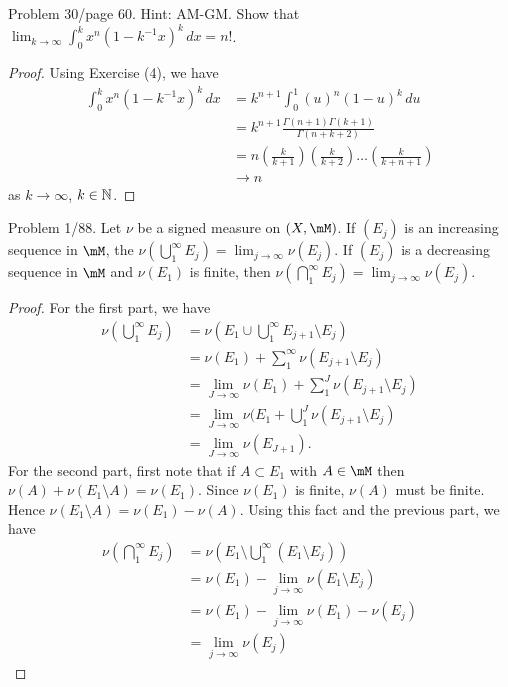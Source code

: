 \documentclass{article}
\begin{document}
 Problem 30/page 60. Hint: AM-GM. Show that $\lim_{k \to \infty} \int_0^k x^n (1 - k^{-1} x) ^k \, dx = n!$.
\begin{proof}
Using Exercise (4), we have
\begin{align*}
\int_0^k x^n (1 - k^{-1} x) ^k \, dx & =  k^{n+1} \int_0^1 (u)^n (1 - u)^k   \, du
\\ & =  k^{n+1} \frac{\Gamma(n+1) \Gamma(k+1)}{\Gamma(n + k + 2)}
\\ & =  n\! \left( \frac k {k +1} \right) \left( \frac k {k +2} \right) \ldots \left( \frac k {k +n +1} \right)
\\ & \to n\!
\end{align*}
as $k \to \infty$, $k \in \mathbb{N}$.
\end{proof}

 Problem 1/88. Let $\nu$ be a signed measure on $(X, \mM)$. If $(E_j)$ is an increasing sequence in $\mM$, the $\nu(\bigcup_1^\infty E_j) = \lim_{j \to \infty} \nu(E_j)$. If $(E_j)$ is a decreasing sequence in $\mM$ and $\nu(E_1)$ is finite, then $\nu(\bigcap_1^\infty E_j) = \lim_{j \to \infty} \nu(E_j)$.
\begin{proof}
For the first part, we have
\begin{align*}
\nu(\bigcup_1^\infty E_j) & = \nu(E_1 \cup \bigcup_1^\infty E_{j+1} \setminus E_j)  
\\ & = \nu(E_1) + \sum_1^\infty \nu(E_{j+1} \setminus E_j)
\\ & = \lim_{J \to \infty} \nu(E_1) + \sum_1^J \nu(E_{j+1} \setminus E_j)
\\ & = \lim_{J \to \infty} \nu(E_1 + \bigcup_1^J \nu(E_{j+1} \setminus E_j)
\\ & = \lim_{J \to \infty} \nu(E_{J+1}).
\end{align*}
For the second part, first note that if $A \subset E_1$ with $A \in \mM$ then $\nu(A) + \nu(E_1 \setminus A) = \nu(E_1)$. Since $\nu(E_1)$ is finite, $\nu(A)$ must be finite. Hence $\nu(E_1 \setminus A) = \nu(E_1) - \nu(A)$.  Using this fact and the previous part, we have
\begin{align*}
\nu(\bigcap_1^\infty E_j) & = \nu(E_1 \setminus \bigcup_1^\infty (E_1 \setminus E_j))
\\ & = \nu(E_1) - \lim_{j \to \infty} \nu(E_1 \setminus E_j)
\\ & = \nu(E_1) - \lim_{j \to \infty} \nu(E_1) - \nu(E_j)
\\ & = \lim_{j \to \infty} \nu(E_j)
\end{align*}
\end{proof}
\end{document}
